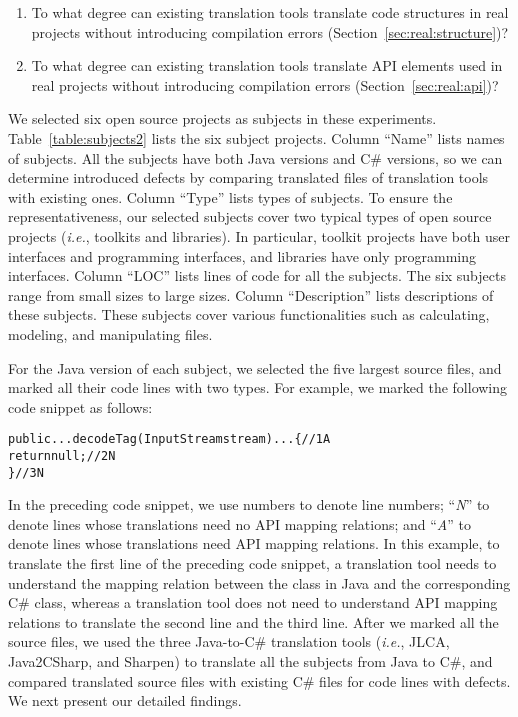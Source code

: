 \begin{enumerate}
\item To what degree can existing translation tools translate code structures in real projects without introducing compilation errors (Section~\ref{sec:real:structure})?
\item To what degree can existing translation tools translate API elements used in real projects without introducing compilation errors (Section~\ref{sec:real:api})?
\end{enumerate}%



We selected six open source projects as subjects in these experiments. Table~\ref{table:subjects2} lists the six subject projects. Column ``Name'' lists names of subjects. All the subjects have both Java versions and C\# versions, so we can determine introduced defects by comparing translated files of translation tools with existing ones. Column ``Type'' lists types of subjects. To ensure the representativeness, our selected subjects cover two typical types of open source projects (\emph{i.e.}, toolkits and libraries). In particular, toolkit projects have both user interfaces and programming interfaces, and libraries have only programming interfaces. Column ``LOC'' lists lines of code for all the subjects. The six subjects range from small sizes to large sizes. Column ``Description'' lists descriptions of these subjects. These subjects cover various functionalities such as calculating, modeling, and manipulating files.

For the Java version of each subject, we selected the five largest source files, and marked all their code lines with two types. For example, we marked the following code snippet as follows:

\begin{CodeOut}%
\begin{alltt}
public ... decodeTag(InputStream stream) ... \{//1A
  return null;//2N
\}//3N
\end{alltt}
\end{CodeOut}

In the preceding code snippet, we use numbers to denote line numbers; ``\emph{N}'' to denote lines whose translations need no API mapping relations; and ``\emph{A}'' to denote lines whose translations need API mapping relations. In this example, to translate the first line of the preceding code snippet, a translation tool needs to understand the mapping relation between the  class in Java and the corresponding C\# class, whereas a translation tool does not need to understand API mapping relations to translate the second line and the third line. After we marked all the source files, we used the three Java-to-C\# translation tools (\emph{i.e.}, JLCA, Java2CSharp, and Sharpen) to translate all the subjects from Java to C\#, and compared translated source files with existing C\# files for code lines with defects. We next present our detailed findings.

